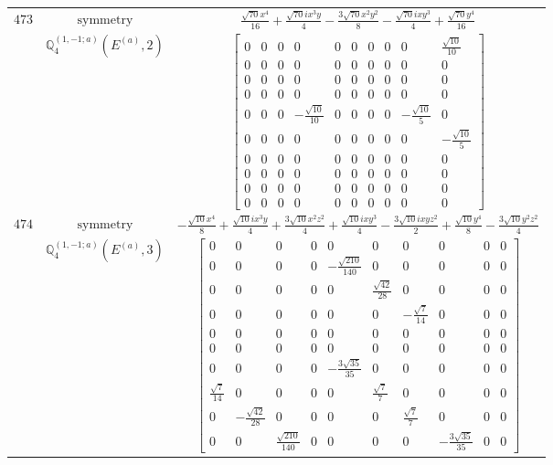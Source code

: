 \documentclass[fleqn,8pt,landscape]{jsarticle}
\begin{document}
\begin{longtable}{ccc}
$ 473 $ & $ \text{symmetry} $ & $ \frac{\sqrt{70} x^{4}}{16} + \frac{\sqrt{70} i x^{3} y}{4} - \frac{3 \sqrt{70} x^{2} y^{2}}{8} - \frac{\sqrt{70} i x y^{3}}{4} + \frac{\sqrt{70} y^{4}}{16} $ \\
$  $ & $ \mathbb{Q}_{4}^{(1,-1;a)}(E^{(a)},2) $ & $ \begin{bmatrix} 0 & 0 & 0 & 0 & 0 & 0 & 0 & 0 & 0 & \frac{\sqrt{10}}{10} \\ 0 & 0 & 0 & 0 & 0 & 0 & 0 & 0 & 0 & 0 \\ 0 & 0 & 0 & 0 & 0 & 0 & 0 & 0 & 0 & 0 \\ 0 & 0 & 0 & 0 & 0 & 0 & 0 & 0 & 0 & 0 \\ 0 & 0 & 0 & - \frac{\sqrt{10}}{10} & 0 & 0 & 0 & 0 & - \frac{\sqrt{10}}{5} & 0 \\ 0 & 0 & 0 & 0 & 0 & 0 & 0 & 0 & 0 & - \frac{\sqrt{10}}{5} \\ 0 & 0 & 0 & 0 & 0 & 0 & 0 & 0 & 0 & 0 \\ 0 & 0 & 0 & 0 & 0 & 0 & 0 & 0 & 0 & 0 \\ 0 & 0 & 0 & 0 & 0 & 0 & 0 & 0 & 0 & 0 \\ 0 & 0 & 0 & 0 & 0 & 0 & 0 & 0 & 0 & 0 \end{bmatrix} $ \\ \hline
$ 474 $ & $ \text{symmetry} $ & $ - \frac{\sqrt{10} x^{4}}{8} + \frac{\sqrt{10} i x^{3} y}{4} + \frac{3 \sqrt{10} x^{2} z^{2}}{4} + \frac{\sqrt{10} i x y^{3}}{4} - \frac{3 \sqrt{10} i x y z^{2}}{2} + \frac{\sqrt{10} y^{4}}{8} - \frac{3 \sqrt{10} y^{2} z^{2}}{4} $ \\
$  $ & $ \mathbb{Q}_{4}^{(1,-1;a)}(E^{(a)},3) $ & $ \begin{bmatrix} 0 & 0 & 0 & 0 & 0 & 0 & 0 & 0 & 0 & 0 \\ 0 & 0 & 0 & 0 & - \frac{\sqrt{210}}{140} & 0 & 0 & 0 & 0 & 0 \\ 0 & 0 & 0 & 0 & 0 & \frac{\sqrt{42}}{28} & 0 & 0 & 0 & 0 \\ 0 & 0 & 0 & 0 & 0 & 0 & - \frac{\sqrt{7}}{14} & 0 & 0 & 0 \\ 0 & 0 & 0 & 0 & 0 & 0 & 0 & 0 & 0 & 0 \\ 0 & 0 & 0 & 0 & 0 & 0 & 0 & 0 & 0 & 0 \\ 0 & 0 & 0 & 0 & - \frac{3 \sqrt{35}}{35} & 0 & 0 & 0 & 0 & 0 \\ \frac{\sqrt{7}}{14} & 0 & 0 & 0 & 0 & \frac{\sqrt{7}}{7} & 0 & 0 & 0 & 0 \\ 0 & - \frac{\sqrt{42}}{28} & 0 & 0 & 0 & 0 & \frac{\sqrt{7}}{7} & 0 & 0 & 0 \\ 0 & 0 & \frac{\sqrt{210}}{140} & 0 & 0 & 0 & 0 & - \frac{3 \sqrt{35}}{35} & 0 & 0 \end{bmatrix} $ \\ \hline

\end{longtable}
\end{document}
